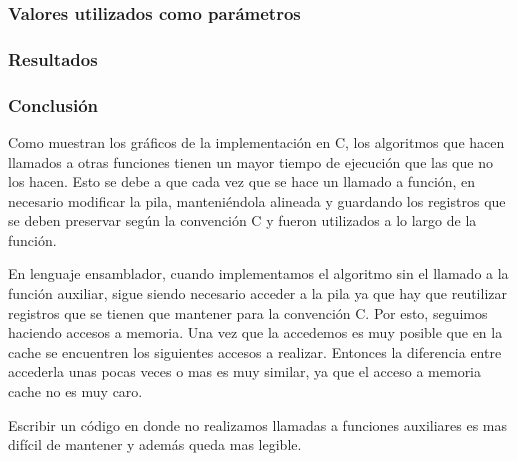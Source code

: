		\subsubsection{Valores utilizados como parámetros} 

		\subsubsection{Resultados}

		\subsubsection{Conclusión}		

		Como muestran los gráficos de la implementación en C, los algoritmos que hacen llamados a otras funciones tienen un mayor tiempo de ejecución que las que no los hacen. Esto se debe a que cada vez que se hace un llamado a función, en necesario modificar la pila, manteniéndola alineada y guardando los registros que se deben preservar según la convención C y fueron utilizados a lo largo de la función.

		En lenguaje ensamblador, cuando implementamos el algoritmo sin el llamado a la función auxiliar, sigue siendo necesario acceder a la pila ya que hay que reutilizar registros que se tienen que mantener para la convención C. Por esto, seguimos haciendo accesos a memoria. Una vez que la accedemos es muy posible que en la cache se encuentren los siguientes accesos a realizar. Entonces la diferencia entre accederla unas pocas veces o mas es muy similar, ya que el acceso a memoria cache no es muy caro.

		Escribir un código en donde no realizamos llamadas a funciones auxiliares es mas difícil de mantener y además queda mas legible.